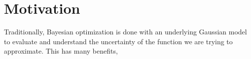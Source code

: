 \chapter{Motivation}

Traditionally, Bayesian optimization is done with an underlying Gaussian model to evaluate and understand the uncertainty of the function we are trying to approximate. This has many benefits,  